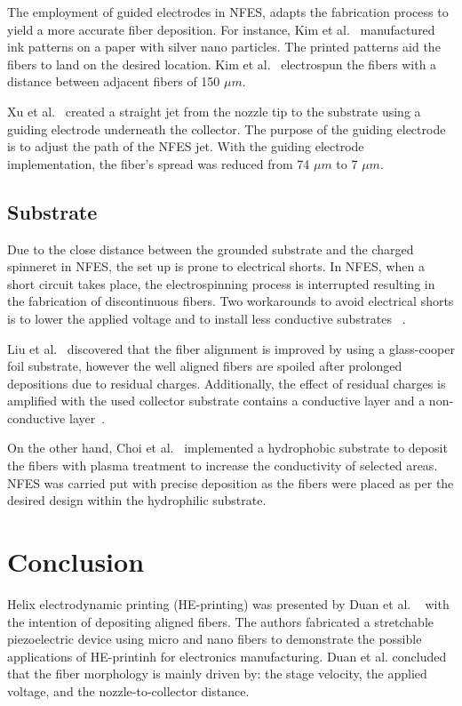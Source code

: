 \documentclass[5p,,preprint,12pt,twocolumn]{elsarticle}
\begin{document}
The employment of guided electrodes in NFES, adapts the fabrication process to yield a more accurate fiber deposition. For instance, Kim et al.\unskip~\cite{527120:11974313} manufactured ink patterns on a paper with silver nano particles. The printed patterns aid the fibers to land on the desired location. Kim et al.\unskip~\cite{527120:11974313} electrospun the fibers with a distance between adjacent fibers of 150 $\mu m $.

Xu et al.\unskip~\cite{527120:11974325} created a straight jet from the nozzle tip to the substrate using a guiding electrode underneath the collector. The purpose of the guiding electrode is to adjust the path of the NFES jet. With the guiding electrode implementation, the fiber's spread was reduced from 74 $\mu m $ to 7 $\mu m $.



\subsection{Substrate}Due to the close distance between the grounded substrate and the charged spinneret in NFES, the set up is prone to electrical shorts. In NFES, when a short circuit takes place, the electrospinning process is interrupted resulting in the fabrication of discontinuous fibers. Two workarounds to avoid electrical shorts is to lower the applied voltage and to install less conductive substrates \unskip~\cite{527120:11974315,527120:12322289}.

Liu et al.\unskip~\cite{527120:11974315} discovered that the fiber alignment is improved by using a glass-cooper foil substrate, however the well aligned fibers are spoiled after prolonged depositions due to residual charges. Additionally, the effect of residual charges is amplified with the used collector substrate contains a conductive layer and a non-conductive layer\unskip~\cite{527120:11974315}.

On the other hand, Choi et al.\unskip~\cite{527120:12322289} implemented a hydrophobic substrate to deposit the fibers with plasma treatment to increase the conductivity of selected areas. NFES was carried put with precise deposition as the fibers were placed as per the desired design within the hydrophilic substrate.
    
\section{Conclusion}
Helix electrodynamic printing (HE-printing) was presented by Duan et al. \unskip~\cite{527120:11974308} with the intention of depositing aligned fibers. The authors fabricated a stretchable piezoelectric device using micro and nano fibers to demonstrate the possible applications of HE-printinh for electronics manufacturing. Duan et al. concluded that the fiber morphology is mainly driven by: the stage velocity, the applied voltage, and the nozzle-to-collector distance.
\end{document}
